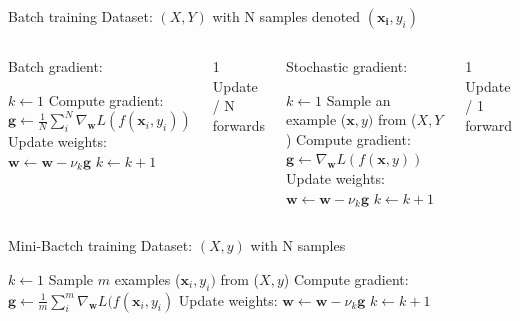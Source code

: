 \documentclass[handout]{beamer}
\begin{document}
\begin{frame}{Batch training}
Dataset: $(X,Y)$ with N samples denoted $(\mathbf{x_i},y_i)$

\begin{columns}[t]
\begin{footnotesize}
\begin{block}{Batch gradient:}\end{block}
    \begin{algorithmic}
    \State $k \leftarrow 1$
    \State Compute gradient: $\mathbf{g} \leftarrow \frac{1}{N}\sum_i^N\nabla_\mathbf{w}L(f(\mathbf{x}_i,y_i))$
    \State Update weights: $\mathbf{w} \leftarrow \mathbf{w} - \nu_k\mathbf{g}$
    \State $k \leftarrow k + 1$
    \EndWhile 
    \end{algorithmic}
    \end{footnotesize}
    \alert{1 Update / N forwards}
    \pause
\begin{footnotesize}
\begin{block}{Stochastic gradient:}\end{block}
    \begin{algorithmic}
    \State $k \leftarrow 1$
    \State Sample an example ($\mathbf{x},y)$ from ($X,Y$)
    \State Compute gradient: $\mathbf{g} \leftarrow \nabla_\mathbf{w}L(f(\mathbf{x},y))$
    \State Update weights: $\mathbf{w} \leftarrow \mathbf{w} - \nu_k\mathbf{g}$
    \State $k \leftarrow k + 1$
    \EndWhile 
    \end{algorithmic}
    \end{footnotesize}
    \alert{1 Update / 1 forward}
    
    
    \end{columns}
\end{frame}

\begin{frame}{Mini-Bactch training}
Dataset: $(X,y)$ with N samples
\begin{footnotesize}
    \begin{algorithmic}
    \State $k \leftarrow 1$
    \State Sample $m$ examples ($\mathbf{x}_i,y_i)$ from ($X,y$)
    \State Compute gradient: $\mathbf{g} \leftarrow \frac{1}{m}\sum_i^m\nabla_\mathbf{w}L(f(\mathbf{x}_i,y_i)$
    \State Update weights: $\mathbf{w} \leftarrow \mathbf{w} - \nu_k\mathbf{g}$
    \State $k \leftarrow k + 1$
    \EndWhile 
    
    \end{algorithmic}
    \end{footnotesize}
\end{frame}
\end{document}
